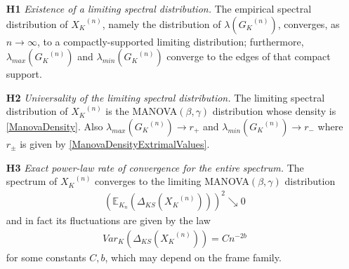 \documentclass[a4paper,12pt]{article}
\newcommand{\E}{\ensuremath{\mathbb{E}}}
\newcommand{\m}{m}
\newcommand{\Xk}{\ensuremath{X_K}}
\newcommand{\Xkn}{\ensuremath{X_{K_n}}}
\newcommand{\Gk}{\ensuremath{G_K}}
\begin{document}
\begin{enumerate}
\item[{\bf H1}] {\em Existence of a limiting spectral distribution.} 
The empirical spectral distribution of $\Xk^{(n)}$, namely the 
distribution of $\lambda(\Gk^{(n)})$, converges, as $n\to \infty$, 
to a compactly-supported limiting distribution; furthermore, 
$\lambda_{max}(\Gk^{(n)})$ and $\lambda_{min}(\Gk^{(n)})$ converge to the
edges of that compact support.

\item[{\bf H2}] {\em Universality of the limiting spectral distribution.} 
The limiting 
spectral distribution of $\Xk^{(n)}$ is the 
MANOVA$(\beta,\gamma)$ distribution  \cite{wachter} whose density is 
\eqref{ManovaDensity}. Also 
$\lambda_{max}(\Gk^{(n)})\to r_+$ and $\lambda_{min}(\Gk^{(n)})\to r_-$
where $r_\pm$ is given by \eqref{ManovaDensityExtrimalValues}.



\item[{\bf H3}] {\em Exact power-law rate of convergence for the entire
spectrum.}
The spectrum of $\Xk^{(n)}$ converges to the limiting
MANOVA$(\beta,\gamma)$ distribution
\begin{eqnarray*} 
   \left(\E_{K_n}\left(\Delta_{KS}(\Xk^{(n)})\right)\right)^2 \searrow 0
\end{eqnarray*}
and in fact its fluctuations are given by the law
\begin{eqnarray} \label{KS_conv:eq}
Var_{K}(\Delta_{KS}(\Xk^{(n)}))=Cn^{-2b} 
\end{eqnarray}
for some constants $C,b$, which may depend on the frame family.


\end{enumerate}
\end{document}
